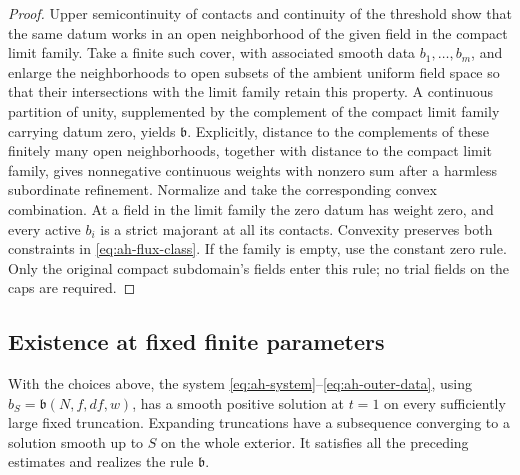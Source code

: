 \begin{proof}
Upper semicontinuity of contacts and continuity of the
threshold show that the same datum works in an open
neighborhood of the given field in the compact limit
family.  Take a finite such cover, with associated
smooth data \(b_1,\dots,b_m\), and enlarge the neighborhoods
to open subsets of the ambient uniform field space so
that their intersections with the limit family retain
this property.  A continuous partition of unity,
supplemented by the complement of the compact limit
family carrying datum zero, yields \(\mathfrak b\).
Explicitly, distance to the complements of these finitely
many open neighborhoods, together with distance to the
compact limit family, gives nonnegative continuous weights
with nonzero sum after a harmless subordinate refinement.
Normalize and take the corresponding convex combination.
At a field in the limit family the zero datum has weight
zero, and every active \(b_i\) is a strict majorant
at all its contacts.  Convexity preserves both constraints
in \eqref{eq:ah-flux-class}.  If the family is empty, use
the constant zero rule.  Only the original compact
subdomain's fields enter this rule; no trial fields on
the caps are required.
\end{proof}

\subsection{Existence at fixed finite parameters}

\begin{proposition}\label{prop:ah-finite-existence}
With the choices above, the system
\eqref{eq:ah-system}--\eqref{eq:ah-outer-data}, using
\(b_S=\mathfrak b(N,f,df,w)\), has a smooth positive
solution at \(t=1\) on every sufficiently large fixed
truncation.  Expanding truncations have a subsequence
converging to a solution smooth up to \(S\) on the
whole exterior.  It satisfies all the preceding estimates
and realizes the rule \(\mathfrak b\).
\end{proposition}


